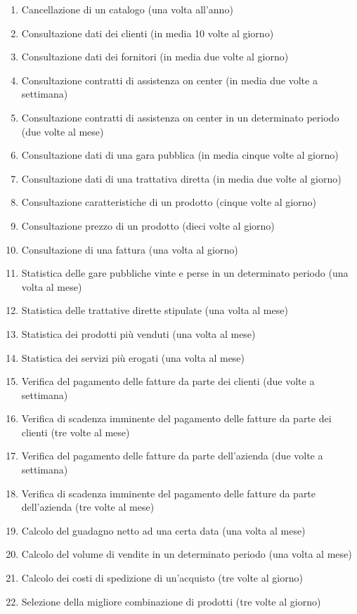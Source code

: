 \begin{enumerate}
  \item Cancellazione di un catalogo (una volta all'anno)
  \item Consultazione dati dei clienti (in media 10 volte al giorno)
  \item Consultazione dati dei fornitori (in media due volte al giorno)
  \item Consultazione contratti di assistenza on center (in media due volte a settimana)
  \item Consultazione contratti di assistenza on center in un determinato periodo (due volte al mese)
  \item Consultazione dati di una gara pubblica (in media cinque volte al giorno)
  \item Consultazione dati di una trattativa diretta (in media due volte al giorno)
  \item Consultazione caratteristiche di un prodotto (cinque volte al giorno)
  \item Consultazione prezzo di un prodotto (dieci volte al giorno)
  \item Consultazione di una fattura (una volta al giorno)
  \item Statistica delle gare pubbliche vinte e perse in un determinato periodo (una volta al mese)
  \item Statistica delle trattative dirette stipulate (una volta al mese)
  \item Statistica dei prodotti più venduti (una volta al mese)
  \item Statistica dei servizi più erogati (una volta al mese)
  \item Verifica del pagamento delle fatture da parte dei clienti (due volte a settimana)
  \item Verifica di scadenza imminente del pagamento delle fatture da parte dei clienti (tre volte al mese)
  \item Verifica del pagamento delle fatture da parte dell'azienda (due volte a settimana)
  \item Verifica di scadenza imminente del pagamento delle fatture da parte dell'azienda (tre volte al mese)
  \item Calcolo del guadagno netto ad una certa data (una volta al mese)
  \item Calcolo del volume di vendite in un determinato periodo (una volta al mese)
  \item Calcolo dei costi di spedizione di un'acquisto (tre volte al giorno)
  \item Selezione della migliore combinazione di prodotti (tre volte al giorno)
  
\end{enumerate}
